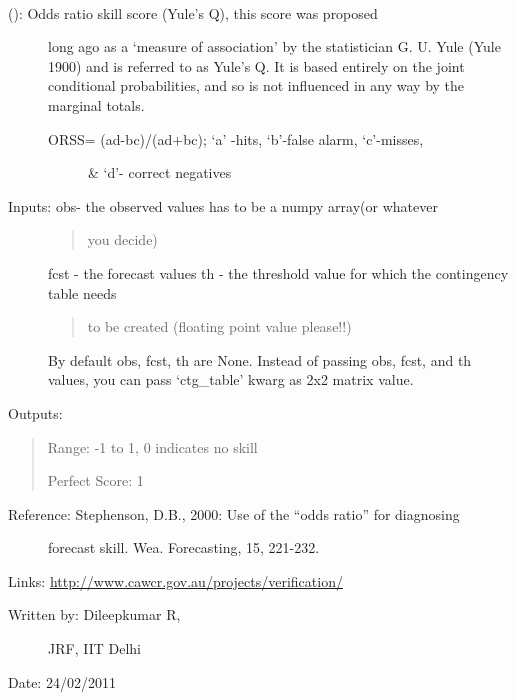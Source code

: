\documentclass[letterpaper,10pt,english]{sphinxmanual}
\begin{document}

\begin{fulllineitems}
\label{diagnosis:ctgfunction.orss}~\begin{description}
\item[{{\hyperref[diagnosis:ctgfunction.orss]{}} (): Odds ratio skill score (Yule's Q), this score was proposed}] \leavevmode
long ago as a `measure of association' by the statistician
G. U. Yule (Yule 1900) and is referred to as Yule's Q. It is
based entirely on the joint conditional probabilities,
and so is not influenced in any way by the marginal totals.
\begin{description}
\item[{ORSS= (ad-bc)/(ad+bc); `a' -hits, `b'-false alarm, `c'-misses,}] \leavevmode
\& `d'- correct negatives

\end{description}

\item[{Inputs: obs- the observed values has to be a numpy array(or whatever}] \leavevmode\begin{quote}

you decide)
\end{quote}

fcst - the forecast values
th  - the threshold value for which the contingency table needs
\begin{quote}

to be created (floating point value please!!)
\end{quote}

By default obs, fcst, th are None. Instead of passing obs, fcst,
and th values, you can pass `ctg\_table' kwarg as 2x2 matrix value.

\end{description}

Outputs:
\begin{quote}

Range: -1 to 1, 0 indicates no skill

Perfect Score: 1
\end{quote}
\begin{description}
\item[{Reference: Stephenson, D.B., 2000: Use of the ``odds ratio'' for diagnosing}] \leavevmode
forecast skill. Wea. Forecasting, 15, 221-232.

\end{description}

Links: \href{http://www.cawcr.gov.au/projects/verification/}{http://www.cawcr.gov.au/projects/verification/}
\begin{description}
\item[{Written by: Dileepkumar R,}] \leavevmode
JRF, IIT Delhi

\end{description}

Date: 24/02/2011

\end{fulllineitems}
\end{document}
